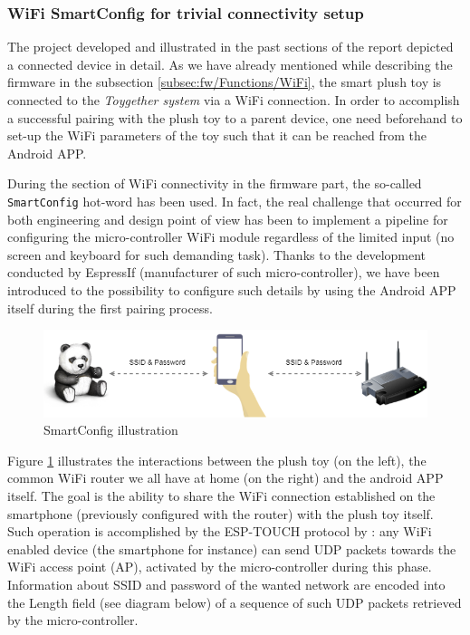 \vspace{0.5cm}

\vspace{0.5cm}


\subsubsection{WiFi SmartConfig for trivial connectivity setup}
\label{subsubsec:android-smartconfig} 

The project developed and illustrated in the past sections of the report depicted a connected device in detail. As we have already mentioned while describing the firmware in the subsection \ref{subsec:fw/Functions/WiFi}, the smart plush toy is connected to the \textit{Toygether system} via a WiFi connection. In order to accomplish a successful pairing with the plush toy to a parent device, one need beforehand to set-up the WiFi parameters of the toy such that it can be reached from the Android APP.

\medskip
During the section of WiFi connectivity in the firmware part, the so-called \texttt{SmartConfig} hot-word has been used. In fact, the real challenge that occurred for both engineering and design point of view has been to implement a pipeline for configuring the micro-controller WiFi module regardless of the limited input (no screen and keyboard for such demanding task). Thanks to the development conducted by EspressIf (manufacturer of such micro-controller), we have been introduced to the possibility to configure such details by using the Android APP itself during the first pairing process.

\begin{figure}[ht]
    \centering
    \includegraphics[scale=0.55]{images/SE_android_smartconfig.png}
    \caption{SmartConfig illustration}
    \label{fig:SE_UML_android_smartconfig}
\end{figure}

Figure \ref{fig:SE_UML_android_smartconfig} illustrates the interactions between the plush toy (on the left), the common WiFi router we all have at home (on the right) and the android APP itself. The goal is the ability to share the WiFi connection established on the smartphone (previously configured with the router) with the plush toy itself. Such operation is accomplished by the ESP-TOUCH protocol by \textcite{smartconfigDoc}: any WiFi enabled device (the smartphone for instance) can send UDP packets towards the WiFi access point (AP), activated by the micro-controller during this phase. Information about SSID and password of the wanted network are encoded into the Length field (see diagram below) of a sequence of such UDP packets retrieved by the micro-controller.


